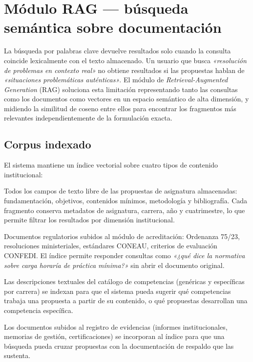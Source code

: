 \section{Módulo RAG — búsqueda semántica sobre documentación}
\label{sec:rag}

La búsqueda por palabras clave devuelve resultados solo cuando la consulta
coincide lexicalmente con el texto almacenado.
Un usuario que busca \textit{«resolución de problemas en contexto real»}
no obtiene resultados si las propuestas hablan de \textit{«situaciones
problemáticas auténticas»}.
El módulo de \emph{Retrieval-Augmented Generation} (RAG) soluciona esta
limitación representando tanto las consultas como los documentos como
vectores en un espacio semántico de alta dimensión, y midiendo la similitud
de coseno entre ellos para encontrar los fragmentos más relevantes
independientemente de la formulación exacta.

\subsection{Corpus indexado}
\label{subsec:rag_corpus}

El sistema mantiene un índice vectorial sobre cuatro tipos de contenido
institucional:

\begin{description}[noitemsep, leftmargin=1.6cm, labelwidth=1.4cm]
  \item[Propuestas] Todos los campos de texto libre de las propuestas de
    asignatura almacenadas: fundamentación, objetivos, contenidos mínimos,
    metodología y bibliografía.
    Cada fragmento conserva metadatos de asignatura, carrera, año y
    cuatrimestre, lo que permite filtrar los resultados por dimensión
    institucional.

  \item[Normativa] Documentos regulatorios subidos al módulo de
    acreditación: Ordenanza 75/23, resoluciones ministeriales,
    estándares CONEAU, criterios de evaluación CONFEDI.
    El índice permite responder consultas como \textit{«¿qué dice la
    normativa sobre carga horaría de
     práctica mínima?»} sin abrir el documento original.

  \item[Competencias] Las descripciones textuales del catálogo de
    competencias (genéricas y específicas por carrera) se indexan para
    que el sistema pueda sugerir qué competencias trabaja una propuesta
    a partir de su contenido, o qué propuestas desarrollan una
    competencia específica.

  \item[Evidencias de acreditación] Los documentos subidos al registro
    de evidencias (informes institucionales, memorias de gestión,
    certificaciones) se incorporan al índice para que una búsqueda
    pueda cruzar propuestas con la documentación de respaldo que las
    sustenta.
\end{description}

